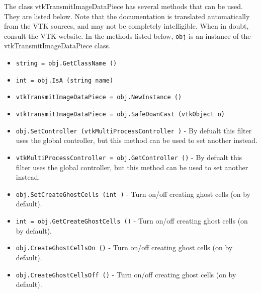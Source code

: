 The class vtkTransmitImageDataPiece has several methods that can be used.
  They are listed below.
Note that the documentation is translated automatically from the VTK sources,
and may not be completely intelligible.  When in doubt, consult the VTK website.
In the methods listed below, \verb|obj| is an instance of the vtkTransmitImageDataPiece class.
\begin{itemize}
\item  \verb|string = obj.GetClassName ()|

\item  \verb|int = obj.IsA (string name)|

\item  \verb|vtkTransmitImageDataPiece = obj.NewInstance ()|

\item  \verb|vtkTransmitImageDataPiece = obj.SafeDownCast (vtkObject o)|

\item  \verb|obj.SetController (vtkMultiProcessController )| -  By defualt this filter uses the global controller,
 but this method can be used to set another instead.

\item  \verb|vtkMultiProcessController = obj.GetController ()| -  By defualt this filter uses the global controller,
 but this method can be used to set another instead.

\item  \verb|obj.SetCreateGhostCells (int )| -  Turn on/off creating ghost cells (on by default).

\item  \verb|int = obj.GetCreateGhostCells ()| -  Turn on/off creating ghost cells (on by default).

\item  \verb|obj.CreateGhostCellsOn ()| -  Turn on/off creating ghost cells (on by default).

\item  \verb|obj.CreateGhostCellsOff ()| -  Turn on/off creating ghost cells (on by default).

\end{itemize}
